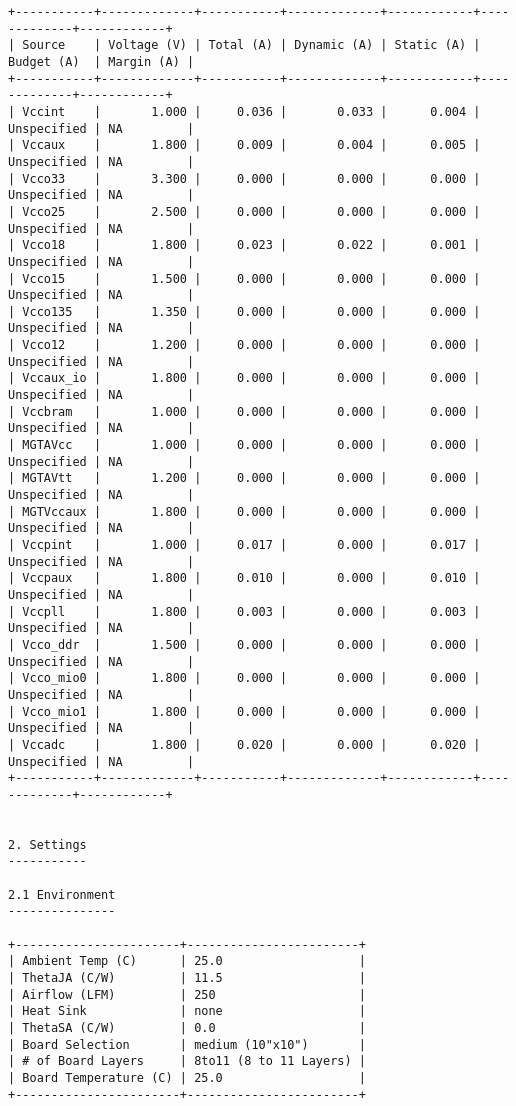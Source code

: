 \begin{Verbatim}[fontsize=\footnotesize,xleftmargin=-2cm]
+-----------+-------------+-----------+-------------+------------+-------------+------------+
| Source    | Voltage (V) | Total (A) | Dynamic (A) | Static (A) | Budget (A)  | Margin (A) |
+-----------+-------------+-----------+-------------+------------+-------------+------------+
| Vccint    |       1.000 |     0.036 |       0.033 |      0.004 | Unspecified | NA         |
| Vccaux    |       1.800 |     0.009 |       0.004 |      0.005 | Unspecified | NA         |
| Vcco33    |       3.300 |     0.000 |       0.000 |      0.000 | Unspecified | NA         |
| Vcco25    |       2.500 |     0.000 |       0.000 |      0.000 | Unspecified | NA         |
| Vcco18    |       1.800 |     0.023 |       0.022 |      0.001 | Unspecified | NA         |
| Vcco15    |       1.500 |     0.000 |       0.000 |      0.000 | Unspecified | NA         |
| Vcco135   |       1.350 |     0.000 |       0.000 |      0.000 | Unspecified | NA         |
| Vcco12    |       1.200 |     0.000 |       0.000 |      0.000 | Unspecified | NA         |
| Vccaux_io |       1.800 |     0.000 |       0.000 |      0.000 | Unspecified | NA         |
| Vccbram   |       1.000 |     0.000 |       0.000 |      0.000 | Unspecified | NA         |
| MGTAVcc   |       1.000 |     0.000 |       0.000 |      0.000 | Unspecified | NA         |
| MGTAVtt   |       1.200 |     0.000 |       0.000 |      0.000 | Unspecified | NA         |
| MGTVccaux |       1.800 |     0.000 |       0.000 |      0.000 | Unspecified | NA         |
| Vccpint   |       1.000 |     0.017 |       0.000 |      0.017 | Unspecified | NA         |
| Vccpaux   |       1.800 |     0.010 |       0.000 |      0.010 | Unspecified | NA         |
| Vccpll    |       1.800 |     0.003 |       0.000 |      0.003 | Unspecified | NA         |
| Vcco_ddr  |       1.500 |     0.000 |       0.000 |      0.000 | Unspecified | NA         |
| Vcco_mio0 |       1.800 |     0.000 |       0.000 |      0.000 | Unspecified | NA         |
| Vcco_mio1 |       1.800 |     0.000 |       0.000 |      0.000 | Unspecified | NA         |
| Vccadc    |       1.800 |     0.020 |       0.000 |      0.020 | Unspecified | NA         |
+-----------+-------------+-----------+-------------+------------+-------------+------------+


2. Settings
-----------

2.1 Environment
---------------

+-----------------------+------------------------+
| Ambient Temp (C)      | 25.0                   |
| ThetaJA (C/W)         | 11.5                   |
| Airflow (LFM)         | 250                    |
| Heat Sink             | none                   |
| ThetaSA (C/W)         | 0.0                    |
| Board Selection       | medium (10"x10")       |
| # of Board Layers     | 8to11 (8 to 11 Layers) |
| Board Temperature (C) | 25.0                   |
+-----------------------+------------------------+



\end{Verbatim}
